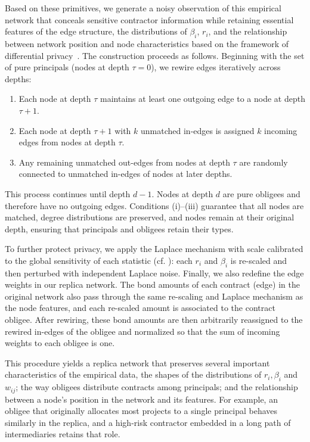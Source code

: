 \documentclass[mnsc,nonblindrev]{informs3}
\begin{document}
\begin{APPENDICES}
Based on these primitives, we generate a noisy observation of this empirical network that conceals sensitive contractor information while retaining essential features of the edge structure, the distributions of $\beta_i$, $r_i$, and the relationship between network position and node characteristics based on the framework of differential privacy~\citep{dwork2006calibrating}. The construction proceeds as follows. Beginning with the set of pure principals (nodes at depth $\tau=0$), we rewire edges iteratively across depths: 
\begin{enumerate}[label=(\roman*)]
    \item Each node at depth $\tau$ maintains at least one outgoing edge to a node at depth $\tau+1$.
    \item Each node at depth $\tau+1$ with $k$ unmatched in-edges is assigned $k$ incoming edges from nodes at depth $\tau$.
    \item Any remaining unmatched out-edges from nodes at depth $\tau$ are randomly connected to unmatched in-edges of nodes at later depths.
\end{enumerate}
This process continues until depth $d-1$. Nodes at depth $d$ are pure obligees and therefore have no outgoing edges. Conditions (i)–(iii) guarantee that all nodes are matched, degree distributions are preserved, and nodes remain at their original depth, ensuring that principals and obligees retain their types.

To further protect privacy, we apply the Laplace mechanism with scale calibrated to the global sensitivity of each statistic (cf. \citealt{dwork2006calibrating}): each $r_i$ and $\beta_i$ is re-scaled and then perturbed with independent Laplace noise.  Finally, we also redefine the edge weights in our replica network.  The bond amounts of each contract (edge) in the original network also pass through the same re-scaling and Laplace mechanism as the node features, and each re-scaled amount is associated to the contract obligee.  After rewiring, these bond amounts are then arbitrarily reassigned to the rewired in-edges of the obligee and normalized so that the sum of incoming weights to each obligee is one.

This procedure yields a replica network that preserves several important characteristics of the empirical data, the shapes of the distributions of $r_i, \beta_i$ and $w_{ij}$; the way obligees distribute contracts among principals; and the relationship between a node’s position in the network and its features. For example, an obligee that originally allocates most projects to a single principal behaves similarly in the replica, and a high-risk contractor embedded in a long path of intermediaries retains that role.



\end{APPENDICES}
\end{document}
